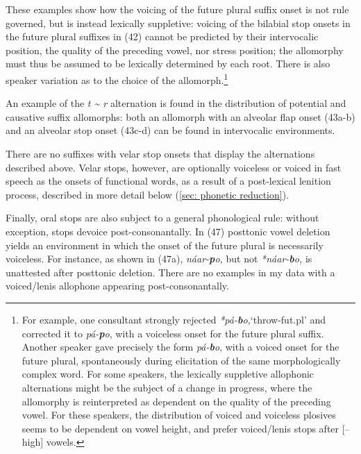 These examples show how the voicing of the future plural suffix onset is not rule governed, but is instead lexically suppletive: voicing of the bilabial stop onsets in the future plural suffixes in (42) cannot be predicted by their intervocalic position, the quality of the preceding vowel, nor stress position; the allomorphy must thus be assumed to be lexically determined by each root. There is also speaker variation as to the choice of the allomorph.\footnote{For example, one consultant strongly rejected \textit{*pá-}\textbf{\textit{b}}\textit{o,}‘throw-fut.pl’ and corrected it to \textit{pá-}\textbf{\textit{p}}\textit{o}, with a voiceless onset for the future plural suffix. Another speaker gave precisely the form \textit{pá-}\textbf{\textit{b}}\textit{o}, with a voiced onset for the future plural, spontaneously during elicitation of the same morphologically complex word. For some speakers, the lexically suppletive allophonic alternations might be the subject of a change in progress, where the allomorphy is reinterpreted as dependent on the quality of the preceding vowel. For these speakers, the distribution of voiced and voiceless plosives seems to be dependent on vowel height, and prefer voiced/lenis stops after [–high] vowels.}

An example of the \textit{t {\textasciitilde} r} alternation is found in the distribution of potential and causative suffix allomorphs: both an allomorph with an alveolar flap onset (43a-b) and an alveolar stop onset (43c-d) can be found in intervocalic environments.






There are no suffixes with velar stop onsets that display the alternations described above. Velar stops, however, are optionally voiceless or voiced in fast speech as the onsets of functional words, as a result of a post-lexical lenition process, described in more detail below (\ref{sec: phonetic reduction}).

Finally, oral stops are also subject to a general phonological rule: without exception, stops devoice post-consonantally. In (47) posttonic vowel deletion yields an environment in which the onset of the future plural is necessarily voiceless. For instance,  as shown in (47a), \textit{náar-}\textbf{\textit{p}}\textit{o,} but not \textit{*náar-}\textbf{\textit{b}}\textit{o,} is unattested after posttonic deletion. There are no examples in my data with a voiced/lenis allophone appearing post-consonantally.

